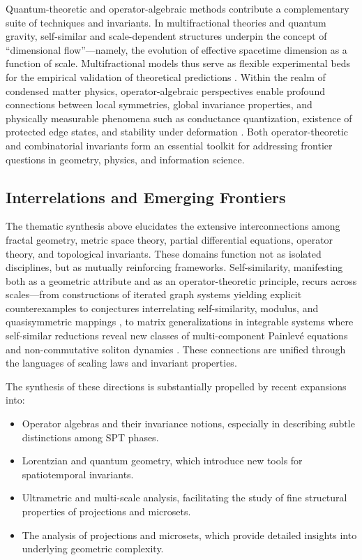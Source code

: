 Quantum-theoretic and operator-algebraic methods contribute a complementary suite of techniques and invariants. In multifractional theories and quantum gravity, self-similar and scale-dependent structures underpin the concept of ``dimensional flow''---namely, the evolution of effective spacetime dimension as a function of scale. Multifractional models thus serve as flexible experimental beds for the empirical validation of theoretical predictions \cite{ref5,ref7,ref20}. Within the realm of condensed matter physics, operator-algebraic perspectives enable profound connections between local symmetries, global invariance properties, and physically measurable phenomena such as conductance quantization, existence of protected edge states, and stability under deformation \cite{ref56,ref57,ref58}. Both operator-theoretic and combinatorial invariants form an essential toolkit for addressing frontier questions in geometry, physics, and information science.

\subsection{Interrelations and Emerging Frontiers}

The thematic synthesis above elucidates the extensive interconnections among fractal geometry, metric space theory, partial differential equations, operator theory, and topological invariants. These domains function not as isolated disciplines, but as mutually reinforcing frameworks. Self-similarity, manifesting both as a geometric attribute and as an operator-theoretic principle, recurs across scales—from constructions of iterated graph systems yielding explicit counterexamples to conjectures interrelating self-similarity, modulus, and quasisymmetric mappings \cite{ref35}, to matrix generalizations in integrable systems where self-similar reductions reveal new classes of multi-component Painlevé equations and non-commutative soliton dynamics \cite{ref64}. These connections are unified through the languages of scaling laws and invariant properties.

The synthesis of these directions is substantially propelled by recent expansions into:

\begin{itemize}
    \item Operator algebras and their invariance notions, especially in describing subtle distinctions among SPT phases.
    \item Lorentzian and quantum geometry, which introduce new tools for spatiotemporal invariants.
    \item Ultrametric and multi-scale analysis, facilitating the study of fine structural properties of projections and microsets.
    \item The analysis of projections and microsets, which provide detailed insights into underlying geometric complexity.
\end{itemize}

